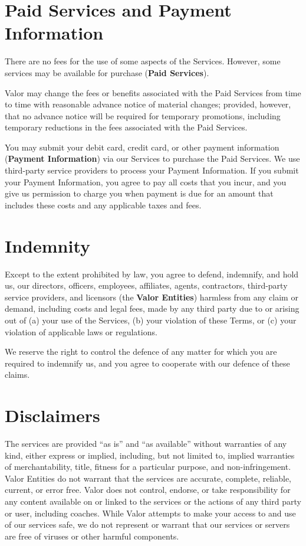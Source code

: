 \documentclass[10pt]{article}
\begin{document}
\section{Paid Services and Payment Information}
There are no fees for the use of some aspects of the Services. However, some services may be available for purchase (\textbf{Paid Services}).

Valor may change the fees or benefits associated with the Paid Services from time to time with reasonable advance notice of material changes; provided, however, that no advance notice will be required for temporary promotions, including temporary reductions in the fees associated with the Paid Services.

You may submit your debit card, credit card, or other payment information (\textbf{Payment Information}) via our Services to purchase the Paid Services. We use third-party service providers to process your Payment Information. If you submit your Payment Information, you agree to pay all costs that you incur, and you give us permission to charge you when payment is due for an amount that includes these costs and any applicable taxes and fees.


\section{Indemnity}
\label{sec:indemnity}
Except to the extent prohibited by law, you agree to defend, indemnify, and hold us, our directors, officers, employees, affiliates, agents, contractors, third-party service providers, and licensors (the \textbf{Valor Entities}) harmless from any claim or demand, including costs and legal fees, made by any third party due to or arising out of (a) your use of the Services, (b) your violation of these Terms, or (c) your violation of applicable laws or regulations.

We reserve the right to control the defence of any matter for which you are required to indemnify us, and you agree to cooperate with our defence of these claims.


\section{Disclaimers}
\label{sec:disclaimers}
The services are provided ``as is'' and ``as available'' without warranties of any kind, either express or implied, including, but not limited to, implied warranties of merchantability, title, fitness for a particular purpose, and non-infringement. Valor Entities do not warrant that the services are accurate, complete, reliable, current, or error free. Valor does not control, endorse, or take responsibility for any content available on or linked to the services or the actions of any third party or user, including coaches. While Valor attempts to make your access to and use of our services safe, we do not represent or warrant that our services or servers are free of viruses or other harmful components.
\end{document}
